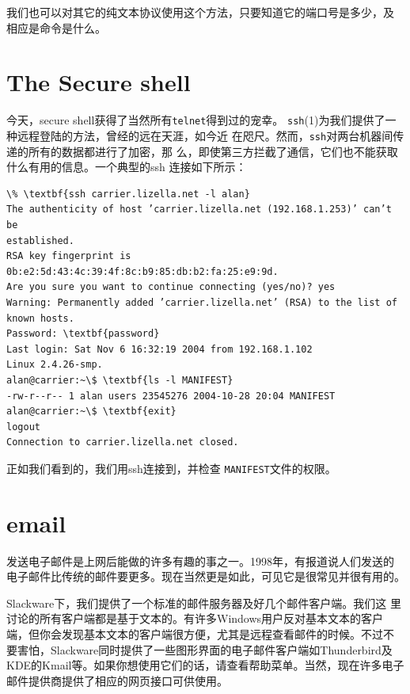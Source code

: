 我们也可以对其它的纯文本协议使用这个方法，只要知道它的端口号是多少，及
相应是命令是什么。

\section{The Secure shell}
\label{chap:basicNetworkCommands:ssh}
今天，secure shell获得了当然所有\texttt{telnet}得到过的宠幸。
\texttt{ssh}(1)为我们提供了一种远程登陆的方法，曾经的远在天涯，如今近
在咫尺。然而，\texttt{ssh}对两台机器间传递的所有的数据都进行了加密，那
么，即使第三方拦截了通信，它们也不能获取什么有用的信息。一个典型的ssh
连接如下所示：
\begin{Verbatim}[frame=single, commandchars=\\\{\}]
\% \textbf{ssh carrier.lizella.net -l alan}
The authenticity of host ’carrier.lizella.net (192.168.1.253)’ can’t be
established.
RSA key fingerprint is 0b:e2:5d:43:4c:39:4f:8c:b9:85:db:b2:fa:25:e9:9d.
Are you sure you want to continue connecting (yes/no)? yes
Warning: Permanently added ’carrier.lizella.net’ (RSA) to the list of
known hosts.
Password: \textbf{password}
Last login: Sat Nov 6 16:32:19 2004 from 192.168.1.102
Linux 2.4.26-smp.
alan@carrier:~\$ \textbf{ls -l MANIFEST}
-rw-r--r-- 1 alan users 23545276 2004-10-28 20:04 MANIFEST
alan@carrier:~\$ \textbf{exit}
logout
Connection to carrier.lizella.net closed.
\end{Verbatim}
正如我们看到的，我们用ssh连接到，并检查
\texttt{MANIFEST}文件的权限。

\section{email}
\label{chap:basicNetworkCommands:email}
发送电子邮件是上网后能做的许多有趣的事之一。1998年，有报道说人们发送的
电子邮件比传统的邮件要更多。现在当然更是如此，可见它是很常见并很有用的。

Slackware下，我们提供了一个标准的邮件服务器及好几个邮件客户端。我们这
里讨论的所有客户端都是基于文本的。有许多Windows用户反对基本文本的客户
端，但你会发现基本文本的客户端很方便，尤其是远程查看邮件的时候。不过不
要害怕，Slackware同时提供了一些图形界面的电子邮件客户端如Thunderbird及
KDE的Kmail等。如果你想使用它们的话，请查看帮助菜单。当然，现在许多电子
邮件提供商提供了相应的网页接口可供使用。


